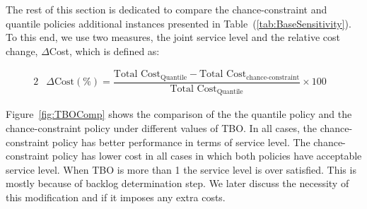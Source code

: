 \documentclass[10pt]{article}
\begin{document}
The rest of this section is dedicated to compare the chance-constraint and quantile policies additional instances presented in Table~(\ref{tab:BaseSensitivity}). To this end, we use two measures, the joint service level and the relative cost change, $\Delta$Cost, which is defined as: 

\begin{alignat}{2}
  & \Delta \text{Cost} (\%) = \dfrac{\text{Total Cost}_{\text{Quantile}} - \text{Total Cost} _{\text{chance-constraint}}}{\text{Total Cost}_\text{{Quantile}}} \times 100& \label{eq:ِDeltaCost} 
 \end{alignat}





Figure~\ref{fig:TBOComp} shows the comparison of the the quantile policy and the chance-constraint policy under different values of TBO. In all cases, the chance-constraint policy has better performance in terms of service level. The chance-constraint policy has lower cost in all cases in which both policies have acceptable service level. When TBO is more than 1 the service level is over satisfied. This is mostly because of backlog determination step. We later discuss the necessity of this modification and if it imposes any extra costs.  
\end{document}
